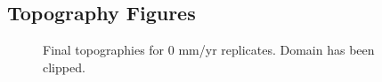 \documentclass[a4paper]{article}
\begin{document}
\begin{appendices}

\section{Topography Figures}

\begin{figure}[!ht]
	\caption{Final topographies for 0 mm/yr replicates. Domain has been clipped.}
	\label{fig:000topo}
\end{figure}


\end{appendices}
\end{document}
